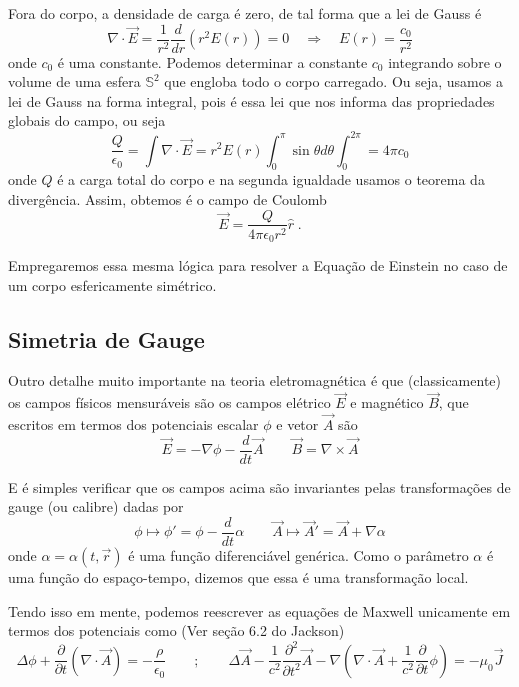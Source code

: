 \documentclass[11pt]{article}
\begin{document}
Fora do corpo, a densidade de carga é zero, de tal forma que a lei de
Gauss é
\[ \tag{2.5} \nabla\cdot \vec{E} = \frac{1}{r^2}\frac{d}{dr}(r^2 E(r)) = 0 \quad \Rightarrow \quad E(r) = \frac{c_0}{r^2} \]
onde \(c_0\) é uma constante. Podemos determinar a constante \(c_0\)
integrando sobre o volume de uma esfera \(\mathbb{S}^2\) que engloba
todo o corpo carregado. Ou seja, usamos a lei de Gauss na forma
integral, pois é essa lei que nos informa das propriedades globais do
campo, ou seja
\[ \tag{2.6} \frac{Q}{\epsilon_0}= \int \nabla\cdot \vec{E} =  r^2 E(r) \int_{0}^\pi \sin\theta d\theta \int_{0}^{2\pi} = 4 \pi c_0  \]
onde \(Q\) é a carga total do corpo e na segunda igualdade usamos o
teorema da divergência. Assim, obtemos é o campo de Coulomb
\[ \tag{2.7} \vec{E} = \frac{Q}{4 \pi \epsilon_0 r^2} \hat{r} \; . \]

Empregaremos essa mesma lógica para resolver a Equação de Einstein no
caso de um corpo esfericamente simétrico.

    \hypertarget{simetria-de-gauge}{%
\subsection{Simetria de Gauge}\label{simetria-de-gauge}}

    Outro detalhe muito importante na teoria eletromagnética é que
(classicamente) os campos físicos mensuráveis são os campos elétrico
\(\vec{E}\) e magnético \(\vec{B}\), que escritos em termos dos
potenciais escalar \(\phi\) e vetor \(\vec{A}\) são
\[\tag{2.8} \vec{E} = - \nabla \phi - \frac{d}{dt}\vec{A} \qquad \vec{B} = \nabla \times \vec{A}  \]

E é simples verificar que os campos acima são invariantes pelas
transformações de gauge (ou calibre) dadas por
\[\tag{2.9} \phi \mapsto \phi' = \phi - \frac{d}{dt}\alpha \qquad \vec{A} \mapsto \vec{A}' = \vec{A} + \nabla \alpha \]
onde \(\alpha = \alpha(t, \vec{r})\) é uma função diferenciável
genérica. Como o parâmetro \(\alpha\) é uma função do espaço-tempo,
dizemos que essa é uma transformação local.

Tendo isso em mente, podemos reescrever as equações de Maxwell
unicamente em termos dos potenciais como (Ver seção 6.2 do Jackson)
\[\tag{2.10} \Delta \phi + \frac{\partial}{\partial t} (\nabla\cdot \vec{A}) = - \frac{\rho}{\epsilon_0} 
\qquad ; \qquad \Delta \vec{A} - \frac{1}{c^2} \frac{\partial^2 }{\partial t^2} \vec{A} - \nabla \left( \nabla \cdot \vec{A} + 
\frac{1}{c^2} \frac{\partial}{\partial t}\phi \right) = - \mu_0 \vec{J} \]
\end{document}
